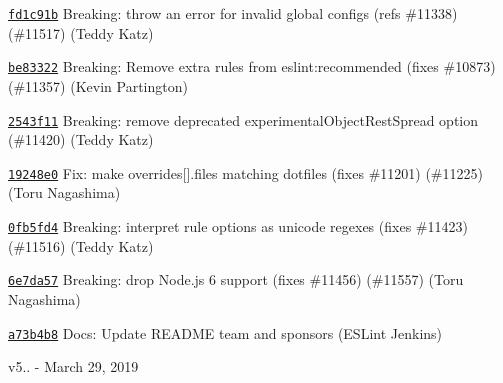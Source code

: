 \begin{DoxyItemize}
\item \href{https://github.com/eslint/eslint/commit/fd1c91b00e8d8c3a83d21e60668d5f1fa61cb214}{\texttt{ {\ttfamily fd1c91b}}} Breaking\+: throw an error for invalid global configs (refs \#11338) (\#11517) (Teddy Katz)
\item \href{https://github.com/eslint/eslint/commit/be833229b355eafb90f3e0bbc29bb106e100bed0}{\texttt{ {\ttfamily be83322}}} Breaking\+: Remove extra rules from eslint\+:recommended (fixes \#10873) (\#11357) (Kevin Partington)
\item \href{https://github.com/eslint/eslint/commit/2543f11dfe8069ed5096073169cf6791d42454db}{\texttt{ {\ttfamily 2543f11}}} Breaking\+: remove deprecated experimental\+Object\+Rest\+Spread option (\#11420) (Teddy Katz)
\item \href{https://github.com/eslint/eslint/commit/19248e0838425748d75518fe9f0a985587793378}{\texttt{ {\ttfamily 19248e0}}} Fix\+: make {\ttfamily overrides\mbox{[}\mbox{]}.files} matching dotfiles (fixes \#11201) (\#11225) (Toru Nagashima)
\item \href{https://github.com/eslint/eslint/commit/0fb5fd402334098dc44cbfbb8ab25919da04843d}{\texttt{ {\ttfamily 0fb5fd4}}} Breaking\+: interpret rule options as unicode regexes (fixes \#11423) (\#11516) (Teddy Katz)
\item \href{https://github.com/eslint/eslint/commit/6e7da57dddc41830df4aee77e31c4320c1557350}{\texttt{ {\ttfamily 6e7da57}}} Breaking\+: drop Node.\+js 6 support (fixes \#11456) (\#11557) (Toru Nagashima)
\item \href{https://github.com/eslint/eslint/commit/a73b4b8d6398b00bdaf90599d9e6d1c80f000f88}{\texttt{ {\ttfamily a73b4b8}}} Docs\+: Update R\+E\+A\+D\+ME team and sponsors (E\+S\+Lint Jenkins)
\end{DoxyItemize}

v5.. -\/ March 29, 2019


